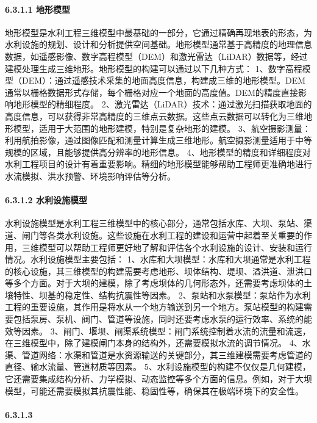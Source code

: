 {\paragraph{6.3.1.1 地形模型}\label{ux5730ux5f62ux6a21ux578b}
地形模型是水利工程三维模型中最基础的一部分，它通过精确再现地表的形态，为水利设施的规划、设计和分析提供空间基础。地形模型通常基于高精度的地理信息数据，如遥感影像、数字高程模型（DEM）和激光雷达（LiDAR）数据等，经过建模处理生成三维地形。地形模型的构建可以通过以下几种方式：
1、数字高程模型（DEM）：通过遥感技术采集的地面高度信息，构建成三维的地形模型。DEM通常以栅格数据形式存储，每个栅格对应一个地面的高度值。DEM的精度直接影响地形模型的精细程度。
2、激光雷达（LiDAR）技术：通过激光扫描获取地面的高度信息，可以获得非常高精度的三维点云数据。这些点云数据可以转化为三维地形模型，适用于大范围的地形建模，特别是复杂地形的建模。
3、航空摄影测量：利用航拍影像，通过图像匹配和测量计算生成三维地形。航空摄影测量适用于中等规模的区域，且能够提供高分辨率的地形信息。
4、地形模型的精度和详细程度对水利工程项目的设计有着重要影响。精细的地形模型能够帮助工程师更准确地进行水流模拟、洪水预警、环境影响评估等分析。 \paragraph{6.3.1.2
水利设施模型}\label{ux6c34ux5229ux8bbeux65bdux6a21ux578b}
水利设施模型是水利工程三维模型中的核心部分，通常包括水库、大坝、泵站、渠道、闸门等各类水利设施。这些设施在水利工程的建设和运营中起着至关重要的作用，三维模型可以帮助工程师更好地了解和评估各个水利设施的设计、安装和运行情况。水利设施模型主要包括：
1、水库和大坝模型：水库和大坝通常是水利工程的核心设施，其三维模型的构建需要考虑地形、坝体结构、堤坝、溢洪道、泄洪口等多个方面。对于大坝的建模，除了考虑坝体的几何形态外，还需要考虑坝体的土壤特性、坝基的稳定性、结构抗震性等因素。
2、泵站和水泵模型：泵站作为水利工程的重要设施，其作用是将水从一个地方输送到另一个地方。泵站模型的构建需要包括泵房、泵机、阀门、管道等设施，同时还要考虑水泵的运行效率、系统的能效等因素。
3、闸门、堰坝、闸渠系统模型：闸门系统控制着水流的流量和流速，在三维模型中，除了建模闸门本身的结构外，还需要模拟水流的调节情况。 4、水渠、管道网络：水渠和管道是水资源输送的关键部分，其三维建模需要考虑管道的直径、输水流量、管道材质等因素。
5、水利设施模型的构建不仅仅是几何建模，它还需要集成结构分析、力学模拟、动态监控等多个方面的信息。例如，对于大坝模型，可能还需要模拟其抗震性能、稳固性等，确保其在极端环境下的安全性。 \paragraph{6.3.1.3
}}
